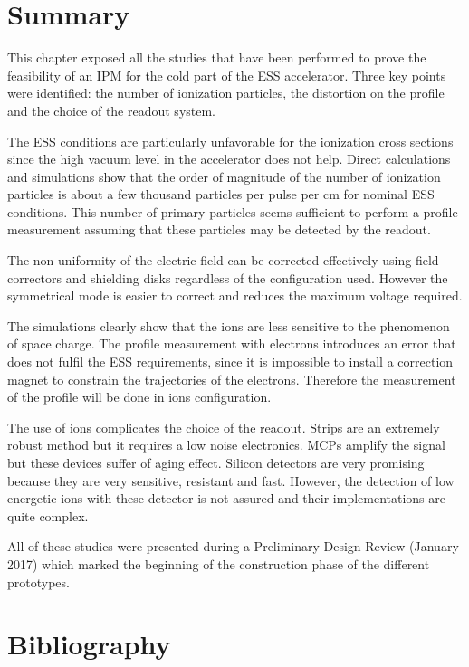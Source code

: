 \begin{refsection}
  \section{Summary}
  \label{ch3:Summary}
  This chapter exposed all the studies that have been performed to prove the feasibility of an IPM for the cold part of the ESS accelerator. Three key points were identified: the number of ionization particles, the distortion on the profile and the choice of the readout system.

  The ESS conditions are particularly unfavorable for the ionization cross sections since the high vacuum level in the accelerator does not help. Direct calculations and simulations show that the order of magnitude of the number of ionization particles is about a few thousand particles per pulse per cm for nominal ESS conditions. This number of primary particles seems sufficient to perform a profile measurement assuming that these particles may be detected by the readout.

  The non-uniformity of the electric field can be corrected effectively using field correctors and shielding disks regardless of the configuration used. However the symmetrical mode is easier to correct and reduces the maximum voltage required.

  The simulations clearly show that the ions are less sensitive to the phenomenon of space charge. The profile measurement with electrons introduces an error that does not fulfil the ESS requirements, since it is impossible to install a correction magnet to constrain the trajectories of the electrons. Therefore the measurement of the profile will be done in ions configuration.

  The use of ions complicates the choice of the readout. Strips are an extremely robust method but it requires a low noise electronics. MCPs amplify the signal but these devices suffer of aging effect. Silicon detectors are very promising because they are very sensitive, resistant and fast. However, the detection of low energetic ions with these detector is not assured and their implementations are quite complex.

  All of these studies were presented during a Preliminary Design Review (January 2017) which marked the beginning of the construction phase of the different prototypes.


  \cleardoublepage
  \section*{Bibliography}
  \label{ch3:bib}
  \printbibliography[heading=subbibliography]

\end{refsection}
